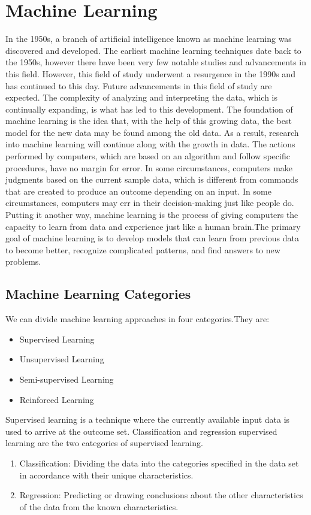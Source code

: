 \section{Machine Learning}
In the 1950s, a branch of artificial intelligence known as machine learning was discovered and developed. The earliest machine learning techniques date back to the 1950s, however there have been very few notable studies and advancements in this field. However, this field of study underwent a resurgence in the 1990s and has continued to this day. Future advancements in this field of study are expected. The complexity of analyzing and interpreting the data, which is continually expanding, is what has led to this development. The foundation of machine learning is the idea that, with the help of this growing data, the best model for the new data may be found among the old data. As a result, research into machine learning will continue along with the growth in data.\cite{mlArticle}
The actions performed by computers, which are based on an algorithm and follow specific procedures, have no margin for error. In some circumstances, computers make judgments based on the current sample data, which is different from commands that are created to produce an outcome depending on an input. In some circumstances, computers may err in their decision-making just like people do. Putting it another way, machine learning is the process of giving computers the capacity to learn from data and experience just like a human brain.\cite{jetol457046}The primary goal of machine learning is to develop models that can learn from previous data to become better, recognize complicated patterns, and find answers to new problems.\cite{Turk}

\subsection{Machine Learning Categories}
We can divide machine learning approaches in four categories.They are:
\begin{itemize}
    \item Supervised Learning
    \item Unsupervised Learning
    \item Semi-supervised Learning
    \item Reinforced Learning
\end{itemize}

Supervised learning is a technique where the currently available input data is used to arrive at the outcome set. Classification and regression supervised learning are the two categories of supervised learning.
\begin{enumerate}
    \item Classification: Dividing the data into the categories specified in the data set in accordance with their unique characteristics.
    \item Regression: Predicting or drawing conclusions about the other characteristics of the data from the known characteristics.
\end{enumerate}

